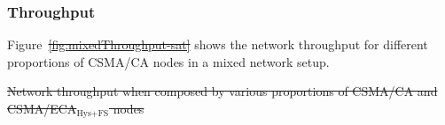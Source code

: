 \documentclass[a4paper,journal]{IEEEtran}
\providecommand{\DIFaddtex}[1]{{\protect\color{blue}\uwave{#1}}} %
\providecommand{\DIFdeltex}[1]{{\protect\color{red}\sout{#1}}}                      %
\providecommand{\DIFaddbegin}{} %
\providecommand{\DIFaddend}{} %
\providecommand{\DIFdelbegin}{} %
\providecommand{\DIFdelend}{} %
\providecommand{\DIFdelFL}[1]{\DIFdel{#1}} %
\providecommand{\DIFadd}[1]{\texorpdfstring{\DIFaddtex{#1}}{#1}} %
\providecommand{\DIFdel}[1]{\texorpdfstring{\DIFdeltex{#1}}{}} %
\begin{document}
	\subsubsection{Throughput}

	Figure~\DIFdelbegin \DIFdel{\ref{fig:mixedThroughput-sat} }\DIFdelend \DIFaddbegin \DIFadd{\ref{fig:coexResults}a }\DIFaddend shows the network throughput for different proportions of CSMA/CA nodes in a mixed network setup.

\DIFdelbegin %
{%
\DIFdelFL{Network throughput when composed by various proportions of CSMA/CA and CSMA/ECA$_{\text{Hys+FS}}$ nodes}}
\DIFdelend %
\end{document}
